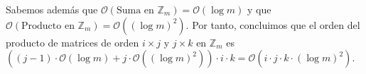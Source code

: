 \begin{enumerate}
		Sabemos además que $\mathcal{O}(\text{Suma en }\mathbb{Z}_m) = \mathcal{O}(\log m)$ y que $\mathcal{O}
		(\text{Producto en } \mathbb{Z}_m) = \mathcal{O}((\log m)^2)$. Por tanto, concluimos que el orden del
		producto de matrices de orden $i \times j$ y $j \times k$ en $\mathbb{Z}_m$ es
		$\left((j-1) \cdot \mathcal{O}(\log m) +j \cdot \mathcal{O}\left((\log m)^2\right)\right) \cdot i \cdot k =
		\mathcal{O}\left(i \cdot j \cdot k \cdot (\log m)^2\right)$.
	\end{enumerate}
